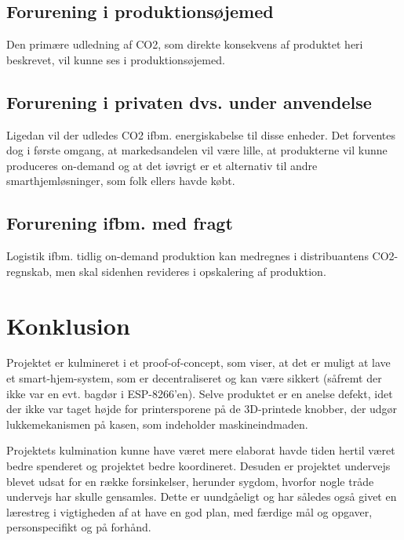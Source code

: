 \documentclass[11pt]{article}
\begin{document}
\subsection{Forurening i produktionsøjemed}
Den primære udledning af CO2, som direkte konsekvens af produktet heri beskrevet, vil kunne ses i produktionsøjemed.
\subsection{Forurening i privaten dvs. under anvendelse}
Ligedan vil der udledes CO2 ifbm. energiskabelse til disse enheder. Det forventes dog i første omgang, at markedsandelen vil være lille, at produkterne vil kunne produceres on-demand og at det iøvrigt er et alternativ til andre smarthjemløsninger, som folk ellers havde købt.
\subsection{Forurening ifbm. med fragt}
Logistik ifbm. tidlig on-demand produktion kan medregnes i distribuantens CO2-regnskab, men skal sidenhen revideres i opskalering af produktion. 

\newpage
\section{Konklusion}
\label{sec:org7454aed}
Projektet er kulmineret i et proof-of-concept, som viser, at det er muligt at lave et smart-hjem-system, som er decentraliseret og kan være sikkert (såfremt der ikke var en evt. bagdør i ESP-8266'en). Selve produktet er en anelse defekt, idet der ikke var taget højde for printersporene på de 3D-printede knobber, der udgør lukkemekanismen på kasen, som indeholder maskineindmaden.

Projektets kulmination kunne have været mere elaborat havde tiden hertil været bedre spenderet og projektet bedre koordineret. Desuden er projektet undervejs blevet udsat for en række forsinkelser, herunder sygdom, hvorfor nogle tråde undervejs har skulle gensamles. Dette er uundgåeligt og har således også givet en lærestreg i vigtigheden af at have en god plan, med færdige mål og opgaver, personspecifikt og på forhånd.

\newpage
\nocite{*}
\printbibliography
\end{document}

